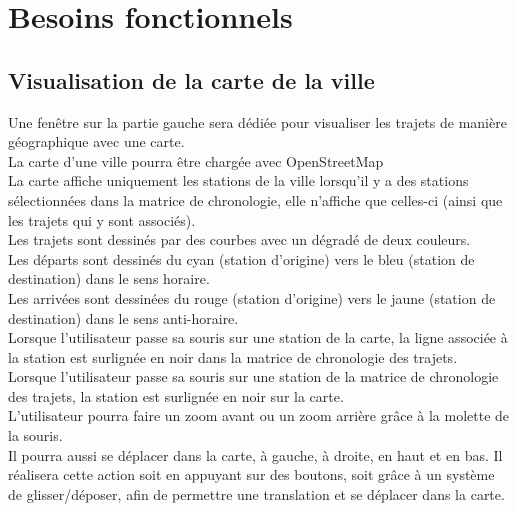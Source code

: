 \documentclass[12pt]{article}
\begin{document}
	\newpage
	\section{Besoins fonctionnels}
		\subsection{Visualisation de la carte de la ville}
		Une fenêtre sur la partie gauche sera dédiée pour visualiser les trajets de
		manière géographique avec une carte.\\
		La carte d’une ville pourra être chargée avec OpenStreetMap\\
		La carte affiche uniquement les stations de la ville lorsqu’il y a des stations
		sélectionnées dans la matrice de chronologie, elle n’affiche que celles-ci (ainsi
		que les trajets qui y sont associés).\\
		Les trajets sont dessinés par des courbes avec un dégradé de deux couleurs.\\
		Les départs sont dessinés du cyan (station d’origine) vers le bleu (station de
		destination) dans le sens horaire.\\
		Les arrivées sont dessinées du rouge (station d’origine) vers le jaune
		(station de destination) dans le sens anti-horaire.\\
		Lorsque l’utilisateur passe sa souris sur une station de la carte, la ligne associée
		à la station est surlignée en noir dans la matrice de chronologie des trajets.\\
		Lorsque l’utilisateur passe sa souris sur une station de la matrice de chronologie
		des trajets, la station est surlignée en noir sur la carte.\\
		L’utilisateur pourra faire un zoom avant ou un zoom arrière grâce à la molette de la
		souris.\\
		Il pourra aussi se déplacer dans la carte, à gauche, à droite, en haut et en bas. Il
		réalisera cette action soit en appuyant sur des boutons, soit grâce à un système
		de glisser/déposer, afin de permettre une translation et se déplacer dans la carte.\\
		
\end{document}
